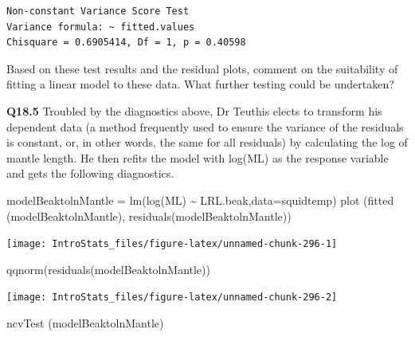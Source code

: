 \documentclass[
  oneside]{krantz}
\newenvironment{Shaded}{\begin{snugshade}}{\end{snugshade}}
\newcommand{\AttributeTok}[1]{\textcolor[rgb]{0.77,0.63,0.00}{#1}}
\newcommand{\FunctionTok}[1]{\textcolor[rgb]{0.00,0.00,0.00}{#1}}
\newcommand{\NormalTok}[1]{#1}
\newcommand{\OtherTok}[1]{\textcolor[rgb]{0.56,0.35,0.01}{#1}}
\newcommand{\SpecialCharTok}[1]{\textcolor[rgb]{0.00,0.00,0.00}{#1}}
\begin{document}
\begin{verbatim}
Non-constant Variance Score Test 
Variance formula: ~ fitted.values 
Chisquare = 0.6905414, Df = 1, p = 0.40598
\end{verbatim}

Based on these test results and the residual plots, comment on the suitability of fitting a linear model to these data. What further testing could be
undertaken?

\newpage

\textbf{Q18.5} Troubled by the diagnostics above, Dr Teuthis elects to transform his dependent data (a method frequently used to ensure the variance of the residuals is constant, or, in other words, the same for all residuals) by calculating the log of mantle length. He then refits the model with log(ML) as the response variable and gets the following diagnostics.

\begin{Shaded}
\begin{Highlighting}[]
\NormalTok{modelBeaktolnMantle }\OtherTok{=}  \FunctionTok{lm}\NormalTok{(}\FunctionTok{log}\NormalTok{(ML) }\SpecialCharTok{\textasciitilde{}}\NormalTok{ LRL.beak,}\AttributeTok{data=}\NormalTok{squidtemp)}
\FunctionTok{plot}\NormalTok{ (}\FunctionTok{fitted}\NormalTok{ (modelBeaktolnMantle), }\FunctionTok{residuals}\NormalTok{(modelBeaktolnMantle))}
\end{Highlighting}
\end{Shaded}

\begin{center}\texttt{[image: IntroStats\_files/figure-latex/unnamed-chunk-296-1]} \end{center}

\begin{Shaded}
\begin{Highlighting}[]
\FunctionTok{qqnorm}\NormalTok{(}\FunctionTok{residuals}\NormalTok{(modelBeaktolnMantle))}
\end{Highlighting}
\end{Shaded}

\begin{center}\texttt{[image: IntroStats\_files/figure-latex/unnamed-chunk-296-2]} \end{center}

\begin{Shaded}
\begin{Highlighting}[]
\FunctionTok{ncvTest}\NormalTok{ (modelBeaktolnMantle)}
\end{Highlighting}
\end{Shaded}
\end{document}
